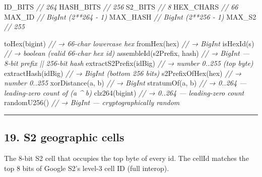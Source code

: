 \documentclass[
  nobib]{tufte-handout}
\newenvironment{Shaded}{}{}
\newcommand{\CommentTok}[1]{\textcolor[rgb]{0.38,0.63,0.69}{\textit{#1}}}
\newcommand{\FunctionTok}[1]{\textcolor[rgb]{0.02,0.16,0.49}{#1}}
\newcommand{\NormalTok}[1]{#1}
\newcommand{\OperatorTok}[1]{\textcolor[rgb]{0.40,0.40,0.40}{#1}}
\begin{document}
\begin{Shaded}
\begin{Highlighting}[]
\NormalTok{ID\_BITS                     }\CommentTok{// 264}
\NormalTok{HASH\_BITS                   }\CommentTok{// 256}
\NormalTok{S2\_BITS                     }\CommentTok{// 8}
\NormalTok{HEX\_CHARS                   }\CommentTok{// 66}
\NormalTok{MAX\_ID                      }\CommentTok{// BigInt (2**264 {-} 1)}
\NormalTok{MAX\_HASH                    }\CommentTok{// BigInt (2**256 {-} 1)}
\NormalTok{MAX\_S2                      }\CommentTok{// 255}

\FunctionTok{toHex}\NormalTok{(bigint)               }\CommentTok{// → 66{-}char lowercase hex}
\FunctionTok{fromHex}\NormalTok{(hex)                }\CommentTok{// → BigInt}
\FunctionTok{isHexId}\NormalTok{(s)                  }\CommentTok{// → boolean (valid 66{-}char hex id)}
\FunctionTok{assembleId}\NormalTok{(s2Prefix}\OperatorTok{,}\NormalTok{ hash)  }\CommentTok{// → BigInt — 8{-}bit prefix || 256{-}bit hash}
\FunctionTok{extractS2Prefix}\NormalTok{(idBig)      }\CommentTok{// → number 0..255 (top byte)}
\FunctionTok{extractHash}\NormalTok{(idBig)          }\CommentTok{// → BigInt (bottom 256 bits)}
\FunctionTok{s2PrefixOfHex}\NormalTok{(hex)          }\CommentTok{// → number 0..255}
\FunctionTok{xorDistance}\NormalTok{(a}\OperatorTok{,}\NormalTok{ b)           }\CommentTok{// → BigInt}
\FunctionTok{stratumOf}\NormalTok{(a}\OperatorTok{,}\NormalTok{ b)             }\CommentTok{// → 0..264 — leading{-}zero count of (a \^{} b)}
\FunctionTok{clz264}\NormalTok{(bigint)              }\CommentTok{// → 0..264 — leading{-}zero count}
\FunctionTok{randomU256}\NormalTok{()                }\CommentTok{// → BigInt — cryptographically random}
\end{Highlighting}
\end{Shaded}

\begin{center}\rule{0.5\linewidth}{0.5pt}\end{center}

\subsection{19. S2 geographic cells}\label{s2-geographic-cells}

The 8-bit S2 cell that occupies the top byte of every id. The cellId
matches the top 8 bits of Google S2's level-3 cell ID (full interop).
\end{document}
